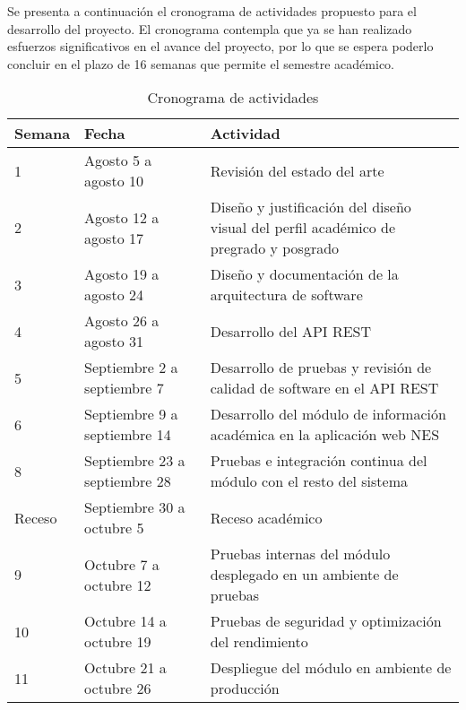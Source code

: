 \documentclass{fmb-proposal}
\begin{document}
Se presenta a continuación el cronograma de actividades propuesto para el desarrollo del proyecto. El cronograma contempla que ya se han realizado esfuerzos significativos en el avance del proyecto, por lo que se espera poderlo concluir en el plazo de 16 semanas que permite el semestre académico.
\begin{table}[ht]
	\centering
	\caption{Cronograma de actividades}
	\label{tabla:cronograma}
	\begin{tabular}{p{1.2cm}p{4.3cm}p{8cm}}
		\toprule
		\textbf{Semana} & \textbf{Fecha}                & \textbf{Actividad}                                                                   \\
		\midrule
		1               & Agosto 5 a agosto 10          & Revisión del estado del arte                                                         \\
		2               & Agosto 12 a agosto 17         & Diseño y justificación del diseño visual del perfil académico de pregrado y posgrado \\
		3               & Agosto 19 a agosto 24         & Diseño y documentación de la arquitectura de software                                \\
		4               & Agosto 26 a agosto 31         & Desarrollo del API REST                                                              \\
		5               & Septiembre 2 a septiembre 7   & Desarrollo de pruebas y revisión de calidad de software en el API REST               \\
		6               & Septiembre 9 a septiembre 14  & Desarrollo del módulo de información académica en la aplicación web NES              \\
		8               & Septiembre 23 a septiembre 28 & Pruebas e integración continua del módulo con el resto del sistema                   \\
		Receso          & Septiembre 30 a octubre 5     & Receso académico                                                                     \\
		9               & Octubre 7 a octubre 12        & Pruebas internas del módulo desplegado en un ambiente de pruebas                     \\
		10              & Octubre 14 a octubre 19       & Pruebas de seguridad y optimización del rendimiento                                  \\
		11              & Octubre 21 a octubre 26       & Despliegue del módulo en ambiente de producción                                      \\

\end{tabular}
\end{table}
\end{document}
